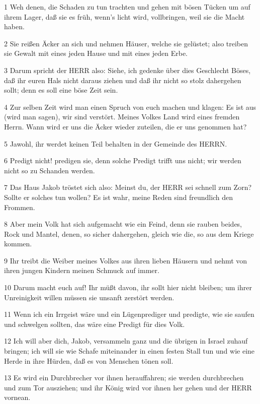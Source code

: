 \par 1 Weh denen, die Schaden zu tun trachten und gehen mit bösen Tücken um auf ihrem Lager, daß sie es früh, wenn's licht wird, vollbringen, weil sie die Macht haben.
\par 2 Sie reißen Äcker an sich und nehmen Häuser, welche sie gelüstet; also treiben sie Gewalt mit eines jeden Hause und mit eines jeden Erbe.
\par 3 Darum spricht der HERR also: Siehe, ich gedenke über dies Geschlecht Böses, daß ihr euren Hals nicht daraus ziehen und daß ihr nicht so stolz dahergehen sollt; denn es soll eine böse Zeit sein.
\par 4 Zur selben Zeit wird man einen Spruch von euch machen und klagen: Es ist aus (wird man sagen), wir sind verstört. Meines Volkes Land wird eines fremden Herrn. Wann wird er uns die Äcker wieder zuteilen, die er uns genommen hat?
\par 5 Jawohl, ihr werdet keinen Teil behalten in der Gemeinde des HERRN.
\par 6 Predigt nicht! predigen sie, denn solche Predigt trifft uns nicht; wir werden nicht so zu Schanden werden.
\par 7 Das Haus Jakob tröstet sich also: Meinst du, der HERR sei schnell zum Zorn? Sollte er solches tun wollen? Es ist wahr, meine Reden sind freundlich den Frommen.
\par 8 Aber mein Volk hat sich aufgemacht wie ein Feind, denn sie rauben beides, Rock und Mantel, denen, so sicher dahergehen, gleich wie die, so aus dem Kriege kommen.
\par 9 Ihr treibt die Weiber meines Volkes aus ihren lieben Häusern und nehmt von ihren jungen Kindern meinen Schmuck auf immer.
\par 10 Darum macht euch auf! Ihr müßt davon, ihr sollt hier nicht bleiben; um ihrer Unreinigkeit willen müssen sie unsanft zerstört werden.
\par 11 Wenn ich ein Irrgeist wäre und ein Lügenprediger und predigte, wie sie saufen und schwelgen sollten, das wäre eine Predigt für dies Volk.
\par 12 Ich will aber dich, Jakob, versammeln ganz und die übrigen in Israel zuhauf bringen; ich will sie wie Schafe miteinander in einen festen Stall tun und wie eine Herde in ihre Hürden, daß es von Menschen tönen soll.
\par 13 Es wird ein Durchbrecher vor ihnen herauffahren; sie werden durchbrechen und zum Tor ausziehen; und ihr König wird vor ihnen her gehen und der HERR vornean.

